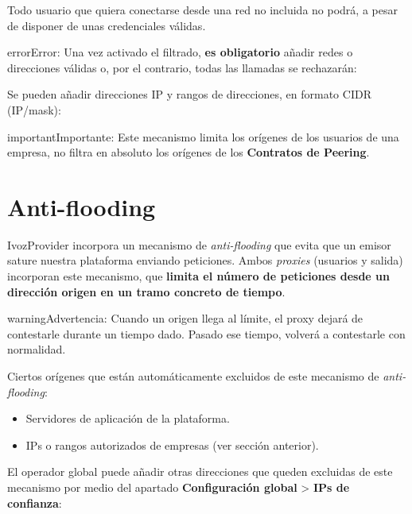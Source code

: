 \documentclass[letterpaper,10pt,spanish]{sphinxmanual}
\begin{document}
Todo usuario que quiera conectarse desde una red no incluida no podrá, a pesar de disponer de unas credenciales válidas.

\begin{notice}{error}{Error:}
Una vez activado el filtrado, \textbf{es obligatorio} añadir redes o direcciones válidas o, por el contrario, todas las llamadas se rechazarán:
\end{notice}

\noindent{}

Se pueden añadir direcciones IP y rangos de direcciones, en formato CIDR (IP/mask):

\noindent{}

\begin{notice}{important}{Importante:}
Este mecanismo limita los orígenes de los usuarios de una empresa, no filtra en absoluto los orígenes de los \textbf{Contratos de Peering}.
\end{notice}


\section{Anti-flooding}
\label{security/index:anti-flooding}
IvozProvider incorpora un mecanismo de \emph{anti-flooding} que evita que un emisor sature nuestra plataforma enviando peticiones. Ambos \emph{proxies} (usuarios y salida) incorporan este mecanismo, que \textbf{limita el número de peticiones desde un dirección origen en un tramo concreto de tiempo}.

\begin{notice}{warning}{Advertencia:}
Cuando un origen llega al límite, el proxy dejará de contestarle durante un tiempo dado. Pasado ese tiempo, volverá a contestarle con normalidad.
\end{notice}

Ciertos orígenes que están automáticamente excluidos de este mecanismo de \emph{anti-flooding}:
\begin{itemize}
\item {} 
Servidores de aplicación de la plataforma.

\item {} 
IPs o rangos autorizados de empresas (ver sección anterior).

\end{itemize}

El operador global puede añadir otras direcciones que queden excluidas de este mecanismo por medio del apartado \textbf{Configuración global} \textgreater{} \textbf{IPs de confianza}:
\end{document}
